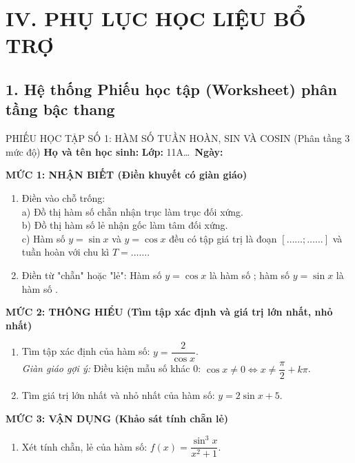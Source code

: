 \documentclass[12pt, a4paper]{article}
\begin{document}
\section*{IV. PHỤ LỤC HỌC LIỆU BỔ TRỢ}

\subsection*{1. Hệ thống Phiếu học tập (Worksheet) phân tầng bậc thang}

\begin{pedabox}{PHIẾU HỌC TẬP SỐ 1: HÀM SỐ TUẦN HOÀN, SIN VÀ COSIN (Phân tầng 3 mức độ)}
\textbf{Họ và tên học sinh:} \dotfill \textbf{Lớp:} 11A\dots \ \textbf{Ngày:} \dotfill

\textbf{MỨC 1: NHẬN BIẾT (Điền khuyết có giàn giáo)}
\begin{enumerate}[leftmargin=0.5cm]
    \item Điền vào chỗ trống:\\
    a) Đồ thị hàm số chẵn nhận trục \dotfill làm trục đối xứng.\\
    b) Đồ thị hàm số lẻ nhận gốc \dotfill làm tâm đối xứng.\\
    c) Hàm số $y = \sin x$ và $y = \cos x$ đều có tập giá trị là đoạn $[\dots\dots; \dots\dots]$ và tuần hoàn với chu kì $T = \dots\dots$.
    \item Điền từ "chẵn" hoặc "lẻ": Hàm số $y = \cos x$ là hàm số \dotfill; hàm số $y = \sin x$ là hàm số \dotfill.
\end{enumerate}

\textbf{MỨC 2: THÔNG HIỂU (Tìm tập xác định và giá trị lớn nhất, nhỏ nhất)}
\begin{enumerate}[leftmargin=0.5cm]
    \item Tìm tập xác định của hàm số: $y = \dfrac{2}{\cos x}$.\\
    \textit{Giàn giáo gợi ý:} Điều kiện mẫu số khác 0: $\cos x \neq 0 \iff x \neq \dfrac{\pi}{2} + k\pi$.
    \item Tìm giá trị lớn nhất và nhỏ nhất của hàm số: $y = 2\sin x + 5$.
\end{enumerate}

\textbf{MỨC 3: VẬN DỤNG (Khảo sát tính chẵn lẻ)}
\begin{enumerate}[leftmargin=0.5cm]
    \item Xét tính chẵn, lẻ của hàm số: $f(x) = \dfrac{\sin^3 x}{x^2 + 1}$.
\end{enumerate}
\end{pedabox}
\end{document}
